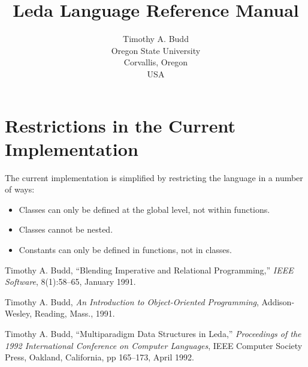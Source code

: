 %
%
\setlength{\textwidth}{5.5in}
\setlength{\oddsidemargin}{0.5in}
\setlength{\evensidemargin}{0.5in}
\setlength{\topmargin}{0.5in}
\pascaltrue
{}

\title{Leda Language Reference Manual}
\author{Timothy A. Budd \\ Oregon State University \\ Corvallis, Oregon \\ USA}
\maketitle



\chapter{Restrictions in the Current Implementation}

The current implementation is simplified by restricting the language in
a number of ways:
\begin{itemize}
\item
Classes can only be defined at the global level, not within functions.
\item
Classes cannot be nested.
\item
Constants can only be defined in functions, not in classes.
\end{itemize}

\begin{thebibliography}{Knuth73}
Timothy A. Budd,
``Blending Imperative and Relational Programming,''
{\em IEEE Software}, 8(1):58--65, January 1991.

Timothy A. Budd, {\em An Introduction to Object-Oriented Programming},
Addison-Wesley, Reading, Mass., 1991.

Timothy A. Budd,
``Multiparadigm Data Structures in Leda,''
{\em Proceedings of the 1992 International Conference on Computer Languages},
IEEE Computer Society Press, Oakland, California, pp 165--173, April 1992.
\end{thebibliography}






